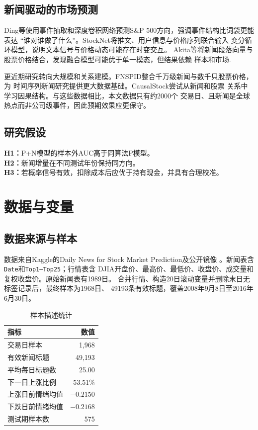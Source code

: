 \documentclass[UTF8,a4paper,9pt,twocolumn,fontset=none]{ctexart}
\begin{document}
\subsection{新闻驱动的市场预测}

Ding等使用事件抽取和深度卷积网络预测S\&P 500方向，强调事件结构比词袋更能表达
“谁对谁做了什么”\cite{ding2015}。StockNet将推文、用户信息与价格序列联合输入
变分循环模型，说明文本信号与价格动态可能存在时变交互\cite{stocknet}。
Akita等将新闻段落向量与股票价格结合，发现融合模型可能优于单一模态，但结果依赖
样本和市场\cite{akita}.

更近期研究转向大规模和关系建模。FNSPID整合千万级新闻与数千只股票价格，为
时间序列新闻研究提供更大数据基础\cite{fnspid}。CausalStock尝试从新闻和股票
关系中学习因果结构\cite{causalstock}。与这些数据相比，本文数据只有约2000个
交易日、且新闻是全球热点而非公司级事件，因此预期效果应更保守。

\subsection{研究假设}

\textbf{H1：}P+N模型的样本外AUC高于同算法P模型。\\
\textbf{H2：}新闻增量在不同测试年份保持同方向。\\
\textbf{H3：}若概率信号有效，扣除成本后应优于持有现金，并具有合理校准。

\section{数据与变量}

\subsection{数据来源与样本}

数据来自Kaggle的Daily News for Stock Market Prediction及公开镜像
\cite{dataset}。新闻表含\texttt{Date}和\texttt{Top1--Top25}；行情表含
DJIA开盘价、最高价、最低价、收盘价、成交量和复权收盘价。原始新闻表有1989日。
合并行情、构造20日滚动变量并删除末日无标签记录后，最终样本为1968日、
49193条有效标题，覆盖2008年9月8日至2016年6月30日。

\begin{table}[t]
\centering
\caption{样本描述统计}
\small
\begin{tabular}{lr}
\toprule
指标 & 数值\\
\midrule
交易日样本 & 1,968\\
有效新闻标题 & 49,193\\
平均每日标题数 & 25.00\\
下一日上涨比例 & 53.51\%\\
上涨日前情绪均值 & $-0.2150$\\
下跌日前情绪均值 & $-0.2168$\\
测试期样本数 & 575\\
\bottomrule
\end{tabular}
\label{tab:sample}
\end{table}
\end{document}
